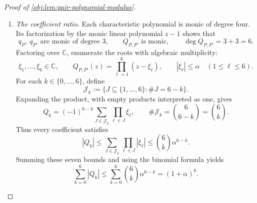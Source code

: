 \begin{proof}[Proof of \cref{obj:lem:pair-polynomial-modulus}]
\begin{enumerate}
Apply this estimate to two rows of \(P\). For every \(i,j\in\mathcal S\),
\[
\begin{aligned}
|(P\varphi)(i)-(P\varphi)(j)|
&=\left|\sum_s(P_{is}-P_{js})\varphi(s)\right|\\
&\le d_\varphi\tau\bigl(P(i,\cdot),P(j,\cdot)\bigr)\\
&\le d_\varphi\delta(P)
\le\alpha d_\varphi.
\end{aligned}
\]
Choose a pair attaining the diameter of \(f_{\mathbb C}\):
\[
i_{\mathrm{diam}},j_{\mathrm{diam}}\in\mathcal S,\qquad
|f_{\mathbb C}(i_{\mathrm{diam}})
 -f_{\mathbb C}(j_{\mathrm{diam}})|=d_f.
\]
Using the eigenvector equation in the preceding contraction estimate gives
\[
\begin{aligned}
|z|\,d_f
&=|zf_{\mathbb C}(i_{\mathrm{diam}})
     -zf_{\mathbb C}(j_{\mathrm{diam}})|\\
&=|(Pf_{\mathbb C})(i_{\mathrm{diam}})
     -(Pf_{\mathbb C})(j_{\mathrm{diam}})|\\
&\le\alpha d_f.
\end{aligned}
\]
Since \(d_f>0\), division gives \(|z|\le\alpha\).
In the second case, \(q_{P'}(z)=0\), the same argument uses \(P'\) and
\(\delta(P')\le\alpha\). We have therefore proved
\[
Q_{P,P'}(z)=0\quad\Longrightarrow\quad |z|\le\alpha
\qquad(z\in\mathbb C).
\]

\item \emph{The coefficient ratio.}
Each characteristic polynomial is monic of degree four.
Its factorization by the monic linear polynomial \(z-1\) shows that
\[
q_P,\ q_{P'}\text{ are monic of degree }3,
\qquad
Q_{P,P'}\text{ is monic},\qquad
\deg Q_{P,P'}=3+3=6.
\]
Factoring over \(\mathbb C\), enumerate the roots with algebraic multiplicity:
\[
\xi_1,\ldots,\xi_6\in\mathbb C,\qquad
Q_{P,P'}(z)=\prod_{\ell=1}^6(z-\xi_\ell),
\qquad |\xi_\ell|\le\alpha\quad(1\le\ell\le6).
\]
For each \(k\in\{0,\ldots,6\}\), define
\[
\mathcal J_k
:=\{J\subseteq\{1,\ldots,6\}:\#J=6-k\}.
\]
Expanding the product, with empty products interpreted as one, gives
\[
Q_k=(-1)^{6-k}
      \sum_{J\in\mathcal J_k}\prod_{\ell\in J}\xi_\ell,
\qquad
\#\mathcal J_k=\binom6{6-k}=\binom6k.
\]
Thus every coefficient satisfies
\[
|Q_k|
\le\sum_{J\in\mathcal J_k}\prod_{\ell\in J}|\xi_\ell|
\le\binom6k\alpha^{6-k}.
\]
Summing these seven bounds and using the binomial formula yields
\[
\sum_{k=0}^6|Q_k|
\le\sum_{k=0}^6\binom6k\alpha^{6-k}
=(1+\alpha)^6.
\]


\end{enumerate}
\end{proof}
